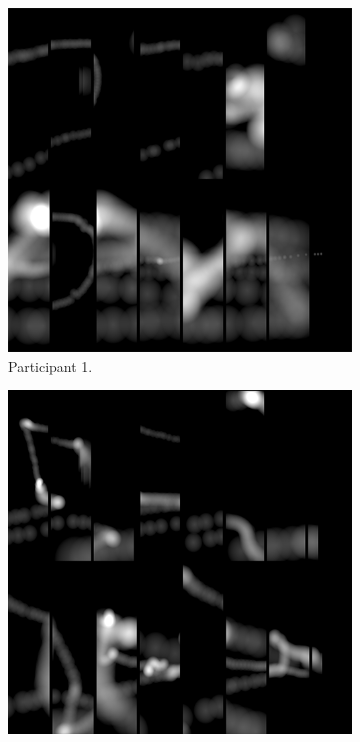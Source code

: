 \begin{figure}[!ht]\centering
    \begin{subfigure}[b]{0.24\textwidth}
        \centering
        \includegraphics[width=\textwidth]{img/data/Panel2/single/1.png}
        \caption{Participant 1.}
    \end{subfigure}
    \hfill
    \begin{subfigure}[b]{0.24\textwidth}
        \centering
        \includegraphics[width=\textwidth]{img/data/Panel2/single/2.png}

\end{subfigure}
\end{figure}
